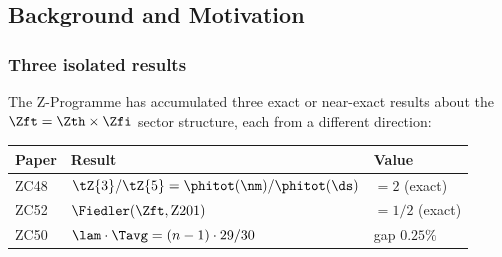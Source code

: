 \documentclass[12pt, a4paper]{article}
\begin{document}
\begin{abstract}
\sloppy
Three Z-Programme results have stood in apparent isolation:
THM-ZC48-01 (the Z$_3$-sector lock-time ratio
$\tZ{3}/\tZ{5} = \phitot(\nm)/\phitot(\ds) = 2$, exact),
THM-ZC52-01 (the Fiedler eigenvalue
$\Fiedler(\Zft,\text{Z201}) = 1/2$, exact),
and CONJ-ZC50-01 (the Wald correction identity
$\lam\cdot\Tavg = (n-1)\cdot 29/30$, Near-Formal).
This paper shows they are three faces of a single structural fact.

The central result is LEM-ZC53-01: the three quantities
$\tZ{3}/\tZ{5}$, $1/\Fiedler$, and $(n_m-1)/(d_s-1)$
are identically equal to~$2$, each arising from a different
projection of the Z$_3$-bottleneck in $\Zft = \Zth\times\Zfi$.

The Bottleneck Bridge Theorem (THM-ZC53-01) then shows that
the Wald correction factor $1 - 1/30 = 29/30$ equals
$1 - \Fiedler/|\Zft|$ exactly, and that this factor arises
as a first-order correction to the uniform $n_m$-suppression
of ZC44 due to the Z$_3$-bottleneck identified in ZC48.
At continuum ($x = n\eps \to 0$):
\[
  \lam\cdot\Tavg \;=\; (n-1)\!\left(1 - \frac{\Fiedler}{|\Zft|}\right)
  \;=\; (n-1)\cdot\frac{29}{30},
\]
promoting CONJ-ZC50-01 to a Theorem (conditional on the
Wald derivation, GAP-ZC42-02).

Two corollaries follow: COR-ZC53-01 closes GAP-ZC52-01
(the open bridge from Fiedler$=1/2$ to CONJ-ZC50-01),
and COR-ZC53-02 records the conditional promotion of CONJ-ZC50-01.
FIND-ZC53-01 assembles the full five-way identity chain.
The Wald residual GAP-ZC42-02 remains open (GAP-ZC53-01).
\end{abstract}

\subsection{Background and Motivation}

\subsubsection{Three isolated results}

The Z-Programme has accumulated three exact or near-exact
results about the $\Zft = \Zth\times\Zfi$ sector structure,
each from a different direction:

\begin{center}
\renewcommand{\arraystretch}{1.3}
\begin{tabular}{@{}lll@{}}
\toprule
Paper & Result & Value \\
\midrule
ZC48 & $\tZ{3}/\tZ{5} = \phitot(\nm)/\phitot(\ds)$ & $= 2$ (exact) \\
ZC52 & $\Fiedler(\Zft,\text{Z201})$ & $= 1/2$ (exact) \\
ZC50 & $\lam\cdot\Tavg = (n-1)\cdot 29/30$ & gap $0.25\%$ \\
\bottomrule
\end{tabular}
\end{center}
\end{document}
